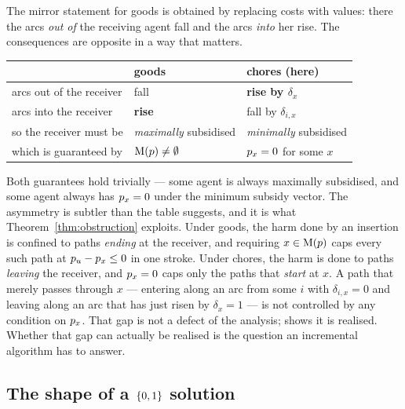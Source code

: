 The mirror statement for goods is obtained by replacing costs with values: there
the arcs \emph{out of} the receiving agent fall and the arcs \emph{into} her
rise. The consequences are opposite in a way that matters.

\begin{center}
\begin{tabular}{@{}lll@{}}
\toprule
 & goods~\cite{BKNS22} & chores (here) \\
\midrule
arcs out of the receiver & fall & \textbf{rise by $\delta_x$} \\
arcs into the receiver   & \textbf{rise} & fall by $\delta_{i,x}$ \\
so the receiver must be  & \emph{maximally} subsidised & \emph{minimally} subsidised \\
which is guaranteed by   & $\mathrm{M}(p) \ne \emptyset$ & $p_x = 0$ for some $x$ \\
\bottomrule
\end{tabular}
\end{center}

Both guarantees hold trivially --- some agent is always maximally subsidised,
and some agent always has $p_x = 0$ under the minimum subsidy vector. The
asymmetry is subtler than the table suggests\ifworking, and it is what
Theorem~\ref{thm:obstruction} exploits\fi. Under goods, the harm done by an
insertion is confined to paths \emph{ending} at the receiver, and requiring
$x \in \mathrm{M}(p)$ caps every such path at $p_u - p_x \le 0$
in one stroke. Under chores, the harm is done to paths \emph{leaving} the
receiver, and $p_x = 0$ caps only the paths that \emph{start} at $x$. A
path that merely passes through $x$ --- entering along an arc from some $i$ with
$\delta_{i,x} = 0$ and leaving along an arc that has just risen by $\delta_x = 1$
--- is not controlled by any condition on $p_x$.
\ifworking
That gap is not a defect of the analysis;  shows it is
realised.
\else
Whether that gap can actually be realised is the question an incremental
algorithm has to answer.
\fi

\subsection{The shape of a $\left\{0,1\right\}$ solution}
\label{sec:twotier}

